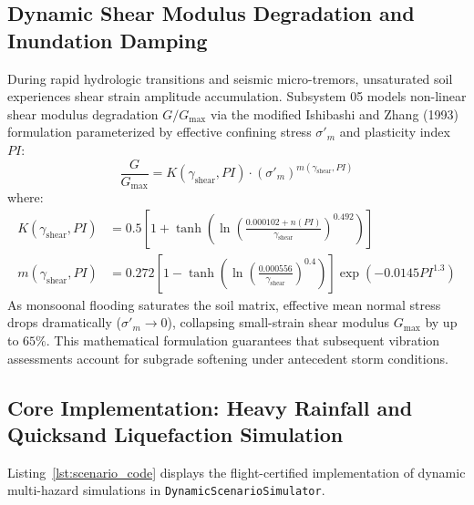\documentclass[11pt,a4paper]{article}
\theoremstyle{definition}
\theoremstyle{remark}
\begin{document}
\subsection{Dynamic Shear Modulus Degradation and Inundation Damping}
During rapid hydrologic transitions and seismic micro-tremors, unsaturated soil experiences shear strain amplitude accumulation. Subsystem 05 models non-linear shear modulus degradation $G/G_{\max}$ via the modified Ishibashi and Zhang (1993) formulation parameterized by effective confining stress $\sigma'_m$ and plasticity index $PI$:
\begin{equation}
    \frac{G}{G_{\max}} = K(\gamma_{\text{shear}}, PI) \cdot (\sigma'_m)^{m(\gamma_{\text{shear}}, PI)}
\end{equation}
\noindent where:
\begin{align}
    K(\gamma_{\text{shear}}, PI) &= 0.5 \left[ 1 + \tanh\left( \ln\left( \frac{0.000102 + n(PI)}{\gamma_{\text{shear}}} \right)^{0.492} \right) \right] \\
    m(\gamma_{\text{shear}}, PI) &= 0.272 \left[ 1 - \tanh\left( \ln\left( \frac{0.000556}{\gamma_{\text{shear}}} \right)^{0.4} \right) \right] \exp\left( -0.0145 PI^{1.3} \right)
\end{align}
As monsoonal flooding saturates the soil matrix, effective mean normal stress drops dramatically ($\sigma'_m \to 0$), collapsing small-strain shear modulus $G_{\max}$ by up to $65\%$. This mathematical formulation guarantees that subsequent vibration assessments account for subgrade softening under antecedent storm conditions.

\subsection{Core Implementation: Heavy Rainfall and Quicksand Liquefaction Simulation}
Listing~\ref{lst:scenario_code} displays the flight-certified implementation of dynamic multi-hazard simulations in \texttt{DynamicScenarioSimulator}.
\end{document}
